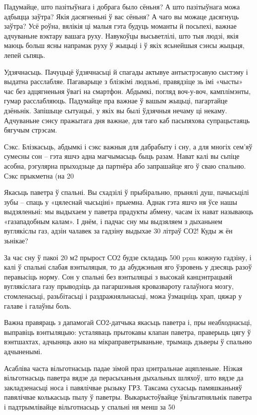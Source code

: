 Падумайце, што пазітыўнага і добрага было сёньня? А што пазітыўнага можа адбыцца заўтра? Якія дасягненьні ў вас сёньня? А чаго вы можаце дасягнуць заўтра? Усё роўна, вялікія ці малыя гэта будуць моманты й посьпехі, важнае адчуваньне вэктару вашага руху. Навукоўцы высьветлілі, што тыя людзі, якія маюць больш ясны напрамак руху ў жыцьці і ў якіх ясьнейшыя сэнсы жыцьця, лепей сьпяць.

Удзячнасьць. Пачуцьцё ўдзячнасьці й спагады актывуе антыстрэсавую сыстэму і выдатна расслабляе. Пагаварыце з блізкімі людзьмі, правядзіце зь імі «чысты» час без адцягненьня ўвагі на смартфон. Абдымкі, погляд воч-у-воч, камплімэнты, гумар расслабляюць. Падумайце пра важнае ў вашым жыцьці, пагартайце дзёньнік. Запішыце сытуацыі, у якіх вы былі ўдзячныя нечаму ці некаму. Адчуваньне сэнсу пражытага дня важнае, для таго каб пасьпяхова супрацьстаяць бягучым стрэсам.

Сэкс. Блізкасьць, абдымкі і сэкс важныя для дабрабыту і сну, а для многіх сем'яў сумесны сон – гэта яшчэ адна магчымасьць быць разам. Нават калі вы сьпіце асобна, рэгулярна прыходзьце да партнёра або запрашайце яго ў сваю спальню. Сэкс прыкметна (на 20%

Якасьць паветра ў спальні. Вы схадзілі ў прыбіральню, прынялі душ, пачысьцілі зубы – спаць у «цялеснай чысьціні» прыемна. Аднак гэта яшчэ ня ўсе нашы выдзяленьні: мы выдыхаем у паветра прадукты абмену, часам іх нават называюць «газападобным калам». І днём, і падчас сну мы выдзяляем з дыханьнем вуглякіслы газ, адзін чалавек за гадзіну выдыхае 30 літраў СО2! Куды ж ён зьнікае?

За час сну ў пакоі 20 м2 прырост СО2 будзе складаць 500 ppm кожную гадзіну, і калі ў спальні слабая вэнтыляцыя, то да абуджэньня яго ўзровень у дзесяць разоў перавысіць норму. Сон у спальні без вэнтыляцыі з высокай канцэнтрацыяй вуглякіслага газу прыводзіць да пагаршэньня кровазвароту галаўнога мозгу, стомленасьці, разьбітасьці і раздражняльнасьці, можа ўзмацніць храп, цяжар у галаве і галаўны боль.

Важна правяраць з дапамогай СО2-датчыка якасьць паветра і, пры неабходнасьці, выправіць вэнтыляцыю: усталяваць прытокавы клапан паветра, праверыць цягу ў вэнтшахтах, адчыняць акно на мікраправетрываньне, трымаць дзьверы ў спальню адчыненымі.

Асабліва часта вільготнасьць падае зімой праз цэнтральнае ацяпленьне. Нізкая вільготнасьць паветра вядзе да перасыханьня дыхальных шляхоў, што вядзе да закладзенасьці носа і павялічвае рызыку ГРЗ. Таксама сухасьць памяшканьняў павялічвае колькасьць пылу ў паветры. Выкарыстоўвайце ўвільгатняльнік паветра і падтрымлівайце вільготнасьць у спальні ня менш за 50%

